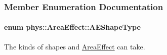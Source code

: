 \subsubsection{Member Enumeration Documentation}
\hypertarget{classphys_1_1AreaEffect_a99b8746c43eac266d48ad613110dc6f9}{
\paragraph[{AEShapeType}]{\setlength{\rightskip}{0pt plus 5cm}enum {\bf phys::AreaEffect::AEShapeType}}\hfill}
\label{d4/d55/classphys_1_1AreaEffect_a99b8746c43eac266d48ad613110dc6f9}


The kinds of shapes and \hyperlink{classphys_1_1AreaEffect}{AreaEffect} can take. 

